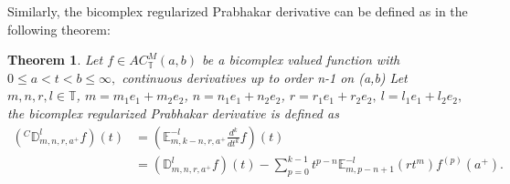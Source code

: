 \documentclass[a4paper,12pt]{article}
\newtheorem{theorem}{Theorem}[section]
\theoremstyle{remark}
\begin{document}
Similarly, the bicomplex  regularized Prabhakar derivative can be defined as in the following theorem:
\begin{theorem}
	Let $f \in AC_\mathbb{T}^M(a,b)$ be a bicomplex valued function with $0\le a<t<b\le\infty,$ 
continuous derivatives up to order n-1 on (a,b) Let $m,n,r,l \in \mathbb{T}$, $m= m_1e_1+m_2e_2$, $ n=n_1e_1+n_2e_2$,  $r=r_1e_1+r_2e_2,~l=l_1e_1+l_2e_2,$ the bicomplex  regularized Prabhakar derivative  is defined as
	\begin{equation}\label{eq: bc reg der}
	\begin{split}
	(^C\mathbb{D}_{m,n,r,a^+}^l f)(t)&=\left(\mathbb{E}_{m,k-n,r,a^+}^{-l}\frac{d^k}{dt^k}f \right) (t)\\
	&=(\mathbb{D}_{m,n,r,a^+}^l f)(t)-\sum_{p=0}^{k-1}t^{p-n}\mathbb{E}_{m,p-n+1}^{-l}(r t^m)f^{(p)}(a^+).
	\end{split}
	\end{equation}
\end{theorem}
\end{document}
